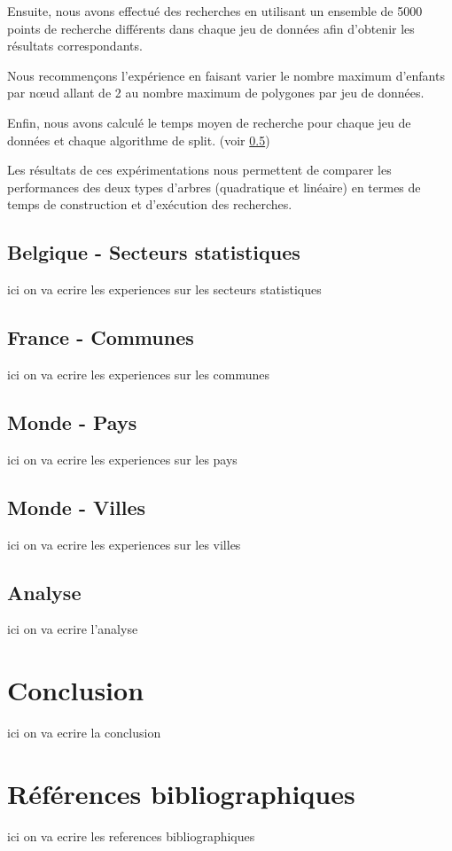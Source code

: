 \documentclass {article}
\begin{document}
Ensuite, nous avons effectué des recherches en utilisant un ensemble de 5000 points de recherche différents
dans chaque jeu de données afin d'obtenir les résultats correspondants.

Nous recommençons l'expérience en faisant varier le nombre maximum d'enfants par nœud allant de 2 au nombre
maximum de polygones par jeu de données.

Enfin, nous avons calculé le temps moyen de recherche pour chaque jeu de données et chaque algorithme de split.
(voir \ref{analyse})

Les résultats de ces expérimentations nous permettent de comparer les performances des deux types d'arbres
(quadratique et linéaire) en termes de temps de construction et d'exécution des recherches.


\subsection {Belgique - Secteurs statistiques}\label{belgique}
ici on va ecrire les experiences sur les secteurs statistiques

\subsection {France - Communes}\label{france}
ici on va ecrire les experiences sur les communes

\subsection {Monde - Pays}\label{mondePays}
ici on va ecrire les experiences sur les pays

\subsection {Monde - Villes}\label{mondeVilles}
ici on va ecrire les experiences sur les villes

\subsection {Analyse}\label{analyse}
ici on va ecrire l'analyse

\section {Conclusion}
ici on va ecrire la conclusion

\section {Références bibliographiques}
ici on va ecrire les references bibliographiques
\end{document}
